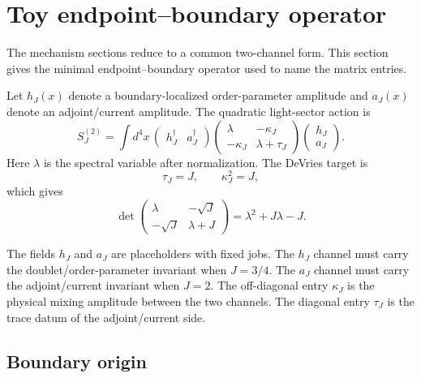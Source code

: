 \section{Toy endpoint--boundary operator}
\label{sec:toy-boundary-operator}

The mechanism sections reduce to a common two-channel form.  This section gives
the minimal endpoint--boundary operator used to name the matrix entries.

Let \(h_J(x)\) denote a boundary-localized order-parameter amplitude and \(a_J(x)\) denote an adjoint/current amplitude.  The quadratic light-sector action is
\begin{equation}
  S^{(2)}_J
  =
  \int d^4x\,
  \begin{pmatrix}h_J^\dagger & a_J^\dagger\end{pmatrix}
  \begin{pmatrix}
    \lambda & -\kappa_J\\
    -\kappa_J & \lambda+\tau_J
  \end{pmatrix}
  \begin{pmatrix}h_J\\ a_J\end{pmatrix}.
  \label{eq:toy-boundary-action}
\end{equation}
Here \(\lambda\) is the spectral variable after normalization.  The DeVries target is
\begin{equation}
  \tau_J=J,\qquad \kappa_J^2=J,
  \label{eq:toy-devries-target}
\end{equation}
which gives
\begin{equation}
  \det
  \begin{pmatrix}
    \lambda & -\sqrt J\\
    -\sqrt J & \lambda+J
  \end{pmatrix}
  =
  \lambda^2+J\lambda-J.
  \label{eq:toy-devries-det}
\end{equation}

The fields \(h_J\) and \(a_J\) are placeholders with fixed jobs.  The \(h_J\) channel must carry the doublet/order-parameter invariant when \(J=3/4\).  The \(a_J\) channel must carry the adjoint/current invariant when \(J=2\).  The off-diagonal entry \(\kappa_J\) is the physical mixing amplitude between the two channels.  The diagonal entry \(\tau_J\) is the trace datum of the adjoint/current side.

\subsection{Boundary origin}

